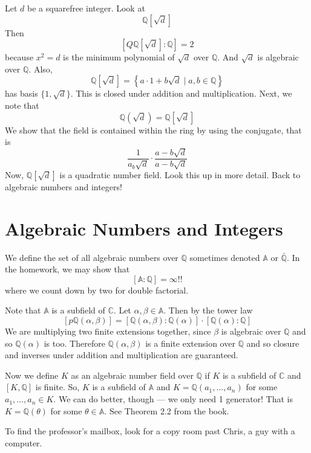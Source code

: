 \documentclass{article}
\begin{document}
Let $d$ be a squarefree integer. Look at 
\[ \mathbb{Q}[\sqrt{d}] \]
Then
\[ [ Q\mathbb{Q}[\sqrt{d}] : \mathbb{Q} ] = 2 \]
because $x^2 = d$ is the minimum polynomial of $\sqrt{d}$ over $\mathbb{Q}$.
And $\sqrt{d}$ is algebraic over $\mathbb{Q}$. Also, 
\[ \mathbb{Q}[\sqrt{d}] = \left\{ a \cdot 1 + b \sqrt{d} \mid a,b \in \mathbb{Q}
\right\} \]
has basis $\{1, \sqrt{d}\}$. This is closed under addition and multiplication.
Next, we note that
\[ \mathbb{Q}(\sqrt{d}) = \mathbb{Q}[\sqrt{d}] \]
We show that the field is contained within the ring by using the conjugate, that
is
\[ \frac{1}{a _ b \sqrt{d}} \cdot \frac{ a - b\sqrt{d} }{a - b\sqrt{d} } \]
Now, $\mathbb{Q}[\sqrt{d}]$ is a quadratic number field. Look this up in more
detail. Back to algebraic numbers and integers!

\section{Algebraic Numbers and Integers}
We define the set of all algebraic numbers over $\mathbb{Q}$ sometimes denoted
$\mathbb{A}$ or $\bar{\mathbb{Q}}$. In the homework, we may show that
\[ [ \mathbb{A} : \mathbb{Q} ] = \infty!! \]
where we count down by two for double factorial. 

Note that $\mathbb{A}$ is a subfield of $\mathbb{C}$. Let $\alpha, \beta \in
\mathbb{A}$. Then by the tower law
\[ [p\mathbb{Q}(\alpha, \beta)] =
[\mathbb{Q}(\alpha,\beta):\mathbb{Q}(\alpha)] \cdot [\mathbb{Q}(\alpha) :
\mathbb{Q}] \]
We are multiplying two finite extensions together, since $\beta$ is algebraic
over $\mathbb{Q}$ and so $\mathbb{Q}(\alpha)$ is too. Therefore
$\mathbb{Q}(\alpha, \beta)$ is a finite extension over $\mathbb{Q}$ and so
closure and inverses under addition and multiplication are guaranteed.

Now we define $K$ as an algebraic number field over $\mathbb{Q}$ if $K$ is a
subfield of $\mathbb{C}$ and $[K,\mathbb{Q}]$ is finite. 
So, $K$ is a subfield of $\mathbb{A}$ and $K = \mathbb{Q}(a_1,\ldots,a_n)$ for
some $a_1,\ldots,a_n \in K$. We can do better, though --- we only need 1
generator! That is $K = \mathbb{Q}(\theta)$ for some $\theta \in \mathbb{A}$.
See Theorem 2.2 from the book. 

To find the professor's mailbox, look for a copy room past Chris, a guy with a
computer. 
\end{document}
